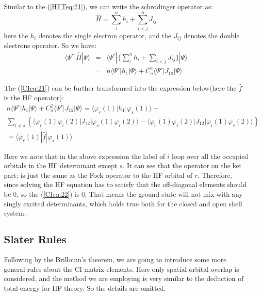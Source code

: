 Similar to the (\ref{HFTeq:21}), we can write the schrodinger operator
as:
\begin{equation}\label{CIeq:20}
  \hat{H} = \sum_{i}^{n}h_{i} + \sum_{i<j}^{n}J_{ij}
\end{equation}
here the $h_{i}$ denotes the single electron operator, and the
$J_{ij}$ denotes the double electrons operator. So we have:
\begin{eqnarray}\label{CIeq:21}
  \langle \Psi^{r}|\hat{H}|\Psi\rangle &=&
  \langle \Psi^{r}|\{\sum_{i}^{n}h_{i}
  + \sum_{i<j}J_{ij} \}|\Psi\rangle      \nonumber \\
  &=& n\langle\Psi^{r}|h_{1}|\Psi\rangle + C_{n}^{2}\langle\Psi^{r}|J_{12}|\Psi\rangle
\end{eqnarray}

The (\ref{CIeq:21}) can be further transformed into the expression
below(here the $\hat{f}$ is the HF operator):
\begin{multline}\label{CIeq:22}
  n\langle\Psi^{r}|h_{1}|\Psi\rangle +
  C_{n}^{2}\langle\Psi^{r}|J_{12}|\Psi\rangle = \langle\varphi_{r}(1)|h_{1}|\varphi_{s}(1)\rangle +  \\
  \sum_{i \neq s} \left\{
    \langle\varphi_{r}(1)\varphi_{i}(2)|J_{12}|\varphi_{s}(1)\varphi_{i}(2)\rangle
    -
    \langle\varphi_{r}(1)\varphi_{i}(2)|J_{12}|\varphi_{i}(1)\varphi_{s}(2)\rangle
  \right\} \\
  = \langle\varphi_{r}(1)|\hat{f}|\varphi_{s}(1)\rangle
\end{multline}

Here we note that in the above expression the label of $i$ loop over
all the occupied orbitals in the HF determinant except $s$. It can see
that the operator on the ket part; is just the same as the Fock
operator to the HF orbital of $r$. Therefore, since solving the HF
equation has to satisfy that the off-diagonal elements should be 0, so
the (\ref{CIeq:22}) is 0. That means the ground state will not mix
with any singly excited determinants, which holds true both for the
closed and open shell system.
\subsection{Slater Rules}
%
%
Following by the Brillouin's theorem, we are going to introduce some
more general rules about the CI matrix elements. Here only spatial
orbital overlap is considered, and the method we are employing is very
similar to the deduction of total energy for HF theory. So the details
are omitted.

